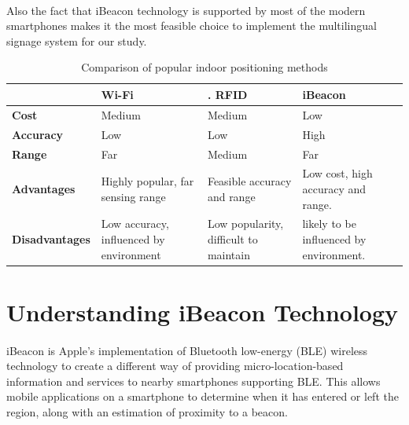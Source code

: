 \documentclass[12pt]{article}
\begin{document}
\paragraph{} Also the fact that iBeacon technology is supported by most of the modern smartphones \cite{indoor} makes it the most feasible choice to implement the multilingual signage system for our study.
 

\begin{table}%
    \centering
    \caption{Comparison of popular indoor positioning methods} 
    \label{my-label2}
       \begin{tabular}{|p{30mm}|p{30mm}|p{30mm}|p{30mm}|}
 \hline
  & \textbf{Wi-Fi }&.        \textbf{RFID} &  \textbf{iBeacon} \\ [0.5ex] 
 \hline\hline
 \textbf{Cost} & Medium & Medium & Low \\ 
 \hline
 \textbf{Accuracy} & Low & Low & High \\
 \hline
 \textbf{Range} & Far & Medium & Far \\
 \hline
 \textbf{Advantages} & Highly popular, far sensing range & Feasible accuracy and range & Low cost, high accuracy and range. \\
 \hline
 \textbf{Disadvantages} & Low accuracy, influenced by environment & Low popularity, difficult to maintain & likely to be influenced by environment. \\ [1ex] 
 \hline
    \end{tabular}
\end{table}

\section{Understanding iBeacon Technology}
\label{iBeacon-tech}
\paragraph{}iBeacon is Apple’s implementation of Bluetooth low-energy (BLE) wireless technology to create a different way of providing micro-location-based information and services to nearby smartphones supporting BLE. This allows mobile applications on a smartphone to determine when it has entered or left the region, along with an estimation of proximity to a beacon. \\
\end{document}
